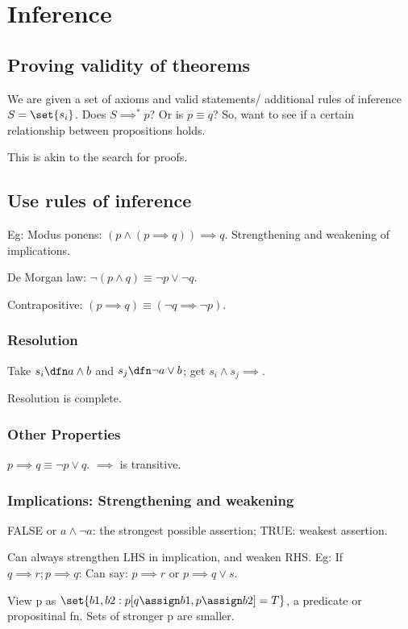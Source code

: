\documentclass[oneside, article]{memoir}
\begin{document}
\chapter{Inference}
\section{Proving validity of theorems}
We are given a set of axioms and valid statements/ additional rules of inference $S = \set{s_i}$. Does $S \implies^{*} p$? Or is $p \equiv q$? So, want to see if a certain relationship between propositions holds.

This is akin to the search for proofs.

\section{Use rules of inference}
Eg: Modus ponens: $(p \land (p \implies q)) \implies q$. Strengthening and weakening of implications.

De Morgan law: $\lnot(p \land q) \equiv \lnot p \lor \lnot q$.

Contrapositive: $(p \implies q) \equiv (\lnot q \implies \lnot p)$.

\subsection{Resolution}
Take $s_i \dfn a \land b$ and $s_j \dfn \lnot a \lor b$; get $s_i \land s_j \implies $.

Resolution is complete.

\subsection{Other Properties}
$p \implies q \equiv \lnot p \lor q$. $\implies$ is transitive.

\subsection{Implications: Strengthening and weakening}
FALSE or $a \land \lnot a$: the strongest possible assertion; TRUE: weakest assertion.

Can always strengthen LHS in implication, and weaken RHS. Eg: If $q \implies r; p \implies q$: Can say: $p \implies r$ or $p \implies q \lor s$.

View p as $\set{b1, b2: p[q \assign b1, p \assign b2] = T}$, a predicate or propositinal fn. Sets of stronger p are smaller.
\end{document}
